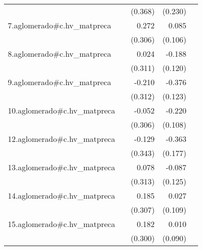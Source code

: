 {\begin{longtable}{l*{4}{D{.}{.}{-1}}}
            &                     &     (0.368)         &     (0.230)         &                     \\
\addlinespace
7.aglomerado#c.hv\_matpreca&                     &       0.272         &       0.085         &                     \\
            &                     &     (0.306)         &     (0.106)         &                     \\
\addlinespace
8.aglomerado#c.hv\_matpreca&                     &       0.024         &      -0.188         &                     \\
            &                     &     (0.311)         &     (0.120)         &                     \\
\addlinespace
9.aglomerado#c.hv\_matpreca&                     &      -0.210         &      -0.376\sym{**} &                     \\
            &                     &     (0.312)         &     (0.123)         &                     \\
\addlinespace
10.aglomerado#c.hv\_matpreca&                     &      -0.052         &      -0.220\sym{*}  &                     \\
            &                     &     (0.306)         &     (0.108)         &                     \\
\addlinespace
12.aglomerado#c.hv\_matpreca&                     &      -0.129         &      -0.363\sym{*}  &                     \\
            &                     &     (0.343)         &     (0.177)         &                     \\
\addlinespace
13.aglomerado#c.hv\_matpreca&                     &       0.078         &      -0.087         &                     \\
            &                     &     (0.313)         &     (0.125)         &                     \\
\addlinespace
14.aglomerado#c.hv\_matpreca&                     &       0.185         &       0.027         &                     \\
            &                     &     (0.307)         &     (0.109)         &                     \\
\addlinespace
15.aglomerado#c.hv\_matpreca&                     &       0.182         &       0.010         &                     \\
            &                     &     (0.300)         &     (0.090)         &                     \\

\end{longtable}}
